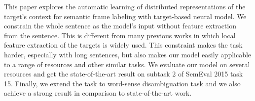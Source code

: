 This paper explores the automatic learning of distributed representations of the target's context for semantic frame labeling with target-based neural model. We constrain the whole sentence as the model's input without feature extraction from the sentence. This is different from many previous works in which local feature extraction of the targets is widely used. This constraint makes the task harder, especially with long sentences, but also makes our model easily applicable to a range of resources and other similar tasks. We evaluate our model on several resources and get the state-of-the-art result on subtask 2 of SemEval 2015 task 15. Finally, we extend the task to word-sense disambiguation task and we also achieve a strong result in comparison to state-of-the-art work.

